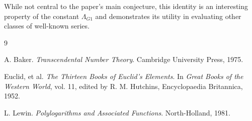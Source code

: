 \documentclass{amsart}
\theoremstyle{plain}
\theoremstyle{definition}
\theoremstyle{remark}
\newcommand{\LambdaG}{\Lambda_{G1}}
\begin{document}
While not central to the paper's main conjecture, this identity is an interesting property of the constant $\LambdaG$ and demonstrates its utility in evaluating other classes of well-known series.

\begin{thebibliography}{9}

A. Baker. \textit{Transcendental Number Theory}. Cambridge University Press, 1975. 

Euclid, et al. \textit{The Thirteen Books of Euclid's Elements}. In \textit{Great Books of the Western World}, vol. 11, edited by R. M. Hutchins, Encyclopaedia Britannica, 1952. 

L. Lewin. \textit{Polylogarithms and Associated Functions}. North-Holland, 1981. 

\end{thebibliography}
\end{document}
